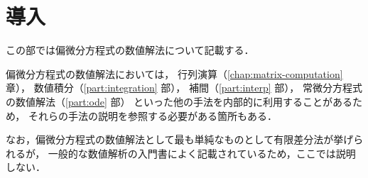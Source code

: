 %

\chapter{導入}

この部では偏微分方程式の数値解法について記載する．

偏微分方程式の数値解法においては，
行列演算（\ref{chap:matrix-computation} 章），
数値積分（\ref{part:integration} 部），
補間（\ref{part:interp} 部），
常微分方程式の数値解法（\ref{part:ode} 部）
といった他の手法を内部的に利用することがあるため，
それらの手法の説明を参照する必要がある箇所もある．

なお，偏微分方程式の数値解法として最も単純なものとして有限差分法が挙げられるが，
一般的な数値解析の入門書によく記載されているため，ここでは説明しない．
